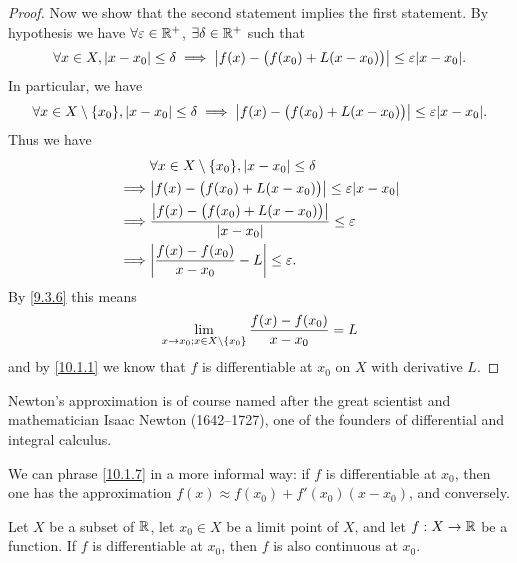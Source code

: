 \begin{proof}
  Now we show that the second statement implies the first statement.
  By hypothesis we have \(\forall \varepsilon \in \mathbb{R}^+\), \(\exists \delta \in \mathbb{R}^+\) such that
  \[
    \forall x \in X, \abs{x - x_0} \leq \delta \implies \abs{f(x) - \big(f(x_0) + L(x - x_0)\big)} \leq \varepsilon \abs{x - x_0}.
  \]
  In particular, we have
  \[
    \forall x \in X \setminus \set{x_0}, \abs{x - x_0} \leq \delta \implies \abs{f(x) - \big(f(x_0) + L(x - x_0)\big)} \leq \varepsilon \abs{x - x_0}.
  \]
  Thus we have
  \begin{align*}
             & \forall x \in X \setminus \set{x_0}, \abs{x - x_0} \leq \delta                     \\
    \implies & \abs{f(x) - \big(f(x_0) + L(x - x_0)\big)} \leq \varepsilon \abs{x - x_0}          \\
    \implies & \dfrac{\abs{f(x) - \big(f(x_0) + L(x - x_0)\big)}}{\abs{x - x_0}} \leq \varepsilon \\
    \implies & \abs{\dfrac{f(x) - f(x_0)}{x - x_0} - L} \leq \varepsilon.
  \end{align*}
  By \cref{9.3.6} this means
  \[
    \lim_{x \to x_0 ; x \in X \setminus \left\lbrace x_0\right\rbrace} \dfrac{f(x) - f(x_0)}{x - x_0} = L
  \]
  and by \cref{10.1.1} we know that \(f\) is differentiable at \(x_0\) on \(X\) with derivative \(L\).
\end{proof}

\begin{rmk}\label{10.1.8}
  Newton's approximation is of course named after the great scientist and mathematician Isaac Newton (1642--1727), one of the founders of differential and integral calculus.
\end{rmk}

\begin{rmk}\label{10.1.9}
  We can phrase \cref{10.1.7} in a more informal way:
  if \(f\) is differentiable at \(x_0\), then one has the approximation \(f(x) \approx f(x_0) + f'(x_0)(x - x_0)\), and conversely.
\end{rmk}

\begin{prop}\label{10.1.10}
  Let \(X\) be a subset of \(\mathbb{R}\), let \(x_0 \in X\) be a limit point of \(X\), and let \(f : X \to \mathbb{R}\) be a function.
  If \(f\) is differentiable at \(x_0\), then \(f\) is also continuous at \(x_0\).
\end{prop}

